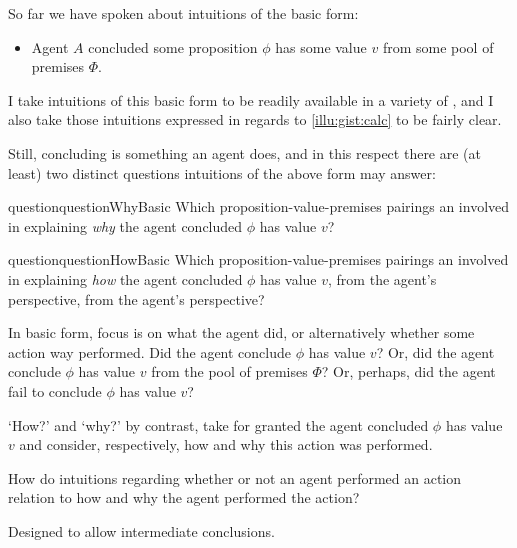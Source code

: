 \begin{note}
  So far we have spoken about intuitions of the basic form:

  \begin{itemize}
  \item
    Agent \(A\) concluded some proposition \(\phi\) has some value \(v\) from some pool of premises \(\Phi\).
  \end{itemize}

  I take intuitions of this basic form to be readily available in a variety of , and I also take those intuitions expressed in regards to \autoref{illu:gist:calc} to be fairly clear.

  Still, concluding is something an agent does, and in this respect there are (at least) two distinct questions intuitions of the above form may answer:%

  \begin{restatable}[\qWhy{}]{question}{questionWhyBasic}
    \label{q:why}
    Which proposition-value-premises pairings an involved in explaining \emph{why} the agent concluded \(\phi\) has value \(v\)?
  \end{restatable}

  \begin{restatable}[\qHow{}]{question}{questionHowBasic}
    \label{q:how}
    Which proposition-value-premises pairings an involved in explaining \emph{how} the agent concluded \(\phi\) has value \(v\), from the agent's perspective, from the agent's perspective?
  \end{restatable}

  In basic form, focus is on what the agent did, or alternatively whether some action way performed.
  Did the agent conclude \(\phi\) has value \(v\)?
  Or, did the agent conclude \(\phi\) has value \(v\) from the pool of premises \(\Phi\)?
  Or, perhaps, did the agent fail to conclude \(\phi\) has value \(v\)?

  `How?' and `why?' by contrast, take for granted the agent concluded \(\phi\) has value \(v\) and consider, respectively, how and why this action was performed.

  How do intuitions regarding whether or not an agent performed an action relation to how and why the agent performed the action?
\end{note}

\begin{note}
  \color{red}
  Designed to allow intermediate conclusions.
\end{note}

